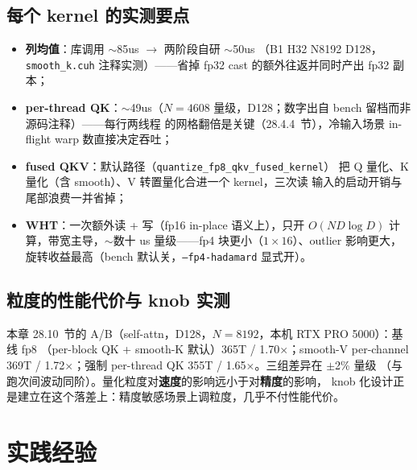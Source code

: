 \subsection{每个 kernel 的实测要点}

\begin{itemize}[itemsep=1pt,topsep=2pt]
  \item \textbf{列均值}：库调用 $\sim$85us $\to$ 两阶段自研 $\sim$50us
        （B1 H32 N8192 D128，\texttt{smooth\_k.cuh} 注释实测）——省掉 fp32 cast
        的额外往返并同时产出 fp32 副本；
  \item \textbf{per-thread QK}：$\sim$49us（$N=4608$ 量级，D128；数字出自 bench
        留档而非源码注释）——每行两线程
        的网格翻倍是关键（28.4.4~节），冷输入场景 in-flight warp 数直接决定吞吐；
  \item \textbf{fused QKV}：默认路径（\texttt{quantize\_fp8\_qkv\_fused\_kernel}）
        把 Q 量化、K 量化（含 smooth）、V 转置量化合进一个 kernel，三次读
        输入的启动开销与尾部浪费一并省掉；
  \item \textbf{WHT}：一次额外读 + 写（fp16 in-place 语义上），只开 $O(N D\log D)$
        计算，带宽主导，$\sim$数十 us 量级——fp4 块更小（$1\times16$）、outlier
        影响更大，旋转收益最高（bench 默认关，\texttt{--fp4-hadamard} 显式开）。
\end{itemize}

\subsection{粒度的性能代价与 knob 实测}

本章 28.10~节的 A/B（self-attn，D128，$N=8192$，本机 RTX PRO 5000）：基线 fp8
（per-block QK + smooth-K 默认）365T / 1.70$\times$；smooth-V per-channel 369T /
1.72$\times$；强制 per-thread QK 355T / 1.65$\times$。三组差异在 $\pm$2\% 量级
（与跑次间波动同阶）。量化粒度对\textbf{速度}的影响远小于对\textbf{精度}的影响，
knob 化设计正是建立在这个落差上：精度敏感场景上调粒度，几乎不付性能代价。

\section{实践经验}

